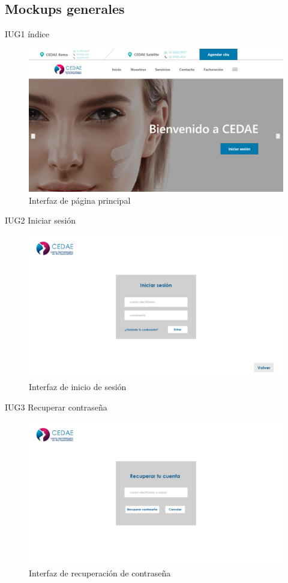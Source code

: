 \documentclass[12pt,letterpaper]{article}
\begin{document}
        \subsection{Mockups generales}
        IUG1 índice
            \begin{figure}[H]
                \centering
                \includegraphics [scale=0.15]{interfaces/gen_index}
                \caption{Interfaz de página principal}
            \end{figure}
        IUG2 Iniciar sesión
            \begin{figure}[H]
                \centering
                \includegraphics [scale=0.2]{interfaces/gen_login}
                \caption{Interfaz de inicio de sesión}
            \end{figure}
        IUG3 Recuperar contraseña
            \begin{figure}[H]
                \centering
                \includegraphics [scale=0.16]{interfaces/gen_recovery}
                \caption{Interfaz de recuperación de contraseña}
            \end{figure}
\end{document}
